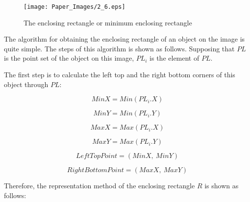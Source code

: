 \documentclass[22pt, UTF8]{article}
\numberwithin{figure}{section}
\numberwithin{table}{section}
\numberwithin{equation}{section} %
\begin{document}
\begin{figure}[H]
    \centering
    \texttt{[image: Paper\_Images/2\_6.eps]}
    \vspace{-3mm} %
    \caption{The enclosing rectangle or minimum enclosing rectangle}
    \vspace{-4mm} %
\end{figure}

\setlength\parindent{2em} The algorithm for obtaining the enclosing rectangle of an object on the image is quite simple. The steps of this algorithm is shown as follows. Supposing that $PL$ is the point set of the object on this image, $PL_{i}$ is the element of $PL$.

\setlength\parindent{2em} The first step is to calculate the left top and the right bottom corners of this object through $PL$:

\vspace{-4mm} %
\begin{equation} %
MinX = Min(PL_{i}.X)
\end{equation}

\vspace{-4mm} %
\begin{equation} %
MinY = Min(PL_{i}.Y)
\end{equation}

\vspace{-4mm} %
\begin{equation} %
MaxX = Max(PL_{i}.X)
\end{equation}

\vspace{-4mm} %
\begin{equation} %
MaxY = Max(PL_{i}.Y)
\end{equation}

\vspace{-4mm} %
\begin{equation} %
LeftTopPoint = (MinX,\ MinY)
\end{equation}

\vspace{-4mm} %
\begin{equation} %
RightBottomPoint = (MaxX,\ MaxY)
\end{equation}

Therefore, the representation method of the enclosing rectangle $R$ is shown as follows:
\end{document}
